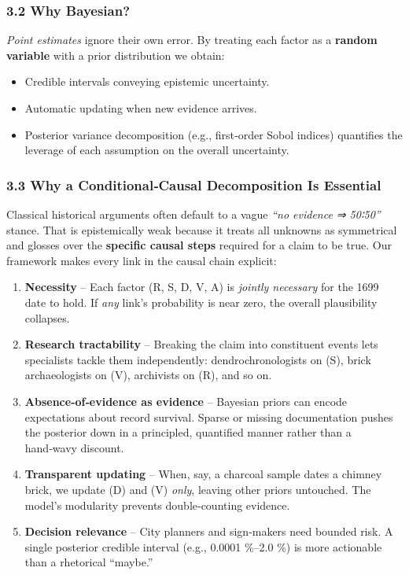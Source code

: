 \documentclass[
  11pt,
]{article}
\providecommand{\tightlist}{%
  \setlength{\itemsep}{0pt}\setlength{\parskip}{0pt}}
\begin{document}
\subsubsection{3.2 Why Bayesian?}\label{why-bayesian}

\emph{Point estimates} ignore their own error. By treating each factor
as a \textbf{random variable} with a prior distribution we obtain:

\begin{itemize}
\tightlist
\item
  Credible intervals conveying epistemic uncertainty.
\item
  Automatic updating when new evidence arrives.
\item
  Posterior variance decomposition (e.g., first‑order Sobol indices)
  quantifies the leverage of each assumption on the overall uncertainty.
\end{itemize}

\subsubsection{3.3 Why a Conditional‑Causal Decomposition Is
Essential}\label{why-a-conditionalcausal-decomposition-is-essential}

Classical historical arguments often default to a vague \emph{``no
evidence ⇒ 50∶50''} stance. That is epistemically weak because it treats
all unknowns as symmetrical and glosses over the \textbf{specific causal
steps} required for a claim to be true. Our framework makes every link
in the causal chain explicit:

\begin{enumerate}
\def\labelenumi{\arabic{enumi}.}
\tightlist
\item
  \textbf{Necessity} -- Each factor (R, S, D, V, A) is \emph{jointly
  necessary} for the 1699 date to hold. If \emph{any} link's probability
  is near zero, the overall plausibility collapses.
\item
  \textbf{Research tractability} -- Breaking the claim into constituent
  events lets specialists tackle them independently: dendrochronologists
  on (S), brick archaeologists on (V), archivists on (R), and so on.
\item
  \textbf{Absence‑of‑evidence as evidence} -- Bayesian priors can encode
  expectations about record survival. Sparse or missing documentation
  pushes the posterior down in a principled, quantified manner rather
  than a hand‑wavy discount.
\item
  \textbf{Transparent updating} -- When, say, a charcoal sample dates a
  chimney brick, we update (D) and (V) \emph{only}, leaving other priors
  untouched. The model's modularity prevents double‑counting evidence.
\item
  \textbf{Decision relevance} -- City planners and sign‑makers need
  bounded risk. A single posterior credible interval (e.g., 0.0001
  \%--2.0 \%) is more actionable than a rhetorical ``maybe.''
\end{enumerate}
\end{document}
